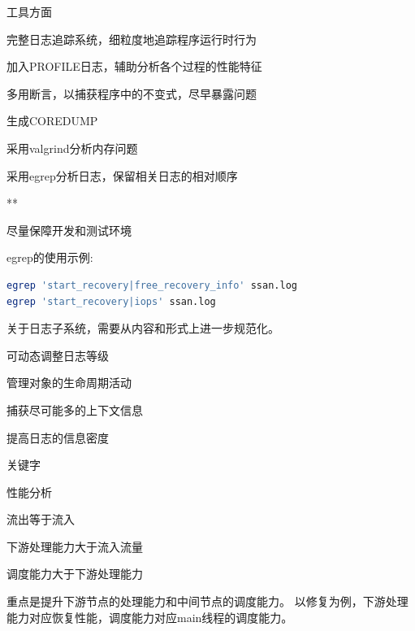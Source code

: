 工具方面
\begin{enumbox}
\item 完整日志追踪系统，细粒度地追踪程序运行时行为
\item 加入PROFILE日志，辅助分析各个过程的性能特征
\item 多用断言，以捕获程序中的不变式，尽早暴露问题
\item 生成COREDUMP
\item 采用valgrind分析内存问题
\item 采用egrep分析日志，保留相关日志的相对顺序
\item ***
\item 尽量保障开发和测试环境
\end{enumbox}

egrep的使用示例:
\begin{lstlisting}[language=bash,frame=single]
egrep 'start_recovery|free_recovery_info' ssan.log
egrep 'start_recovery|iops' ssan.log
\end{lstlisting}

关于日志子系统，需要从内容和形式上进一步规范化。
\begin{enumbox}
\item 可动态调整日志等级
\item 管理对象的生命周期活动
\item 捕获尽可能多的上下文信息
\item 提高日志的信息密度
\item 关键字
\end{enumbox}

性能分析
\begin{enumbox}
\item 流出等于流入
\item 下游处理能力大于流入流量
\item 调度能力大于下游处理能力
\end{enumbox}

重点是提升下游节点的处理能力和中间节点的调度能力。
以修复为例，下游处理能力对应恢复性能，调度能力对应main线程的调度能力。
